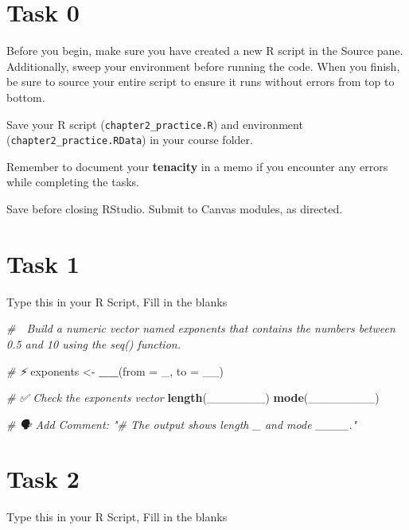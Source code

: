 \documentclass[
  12pt,
]{scrreprt}
\newenvironment{Shaded}{\begin{snugshade}}{\end{snugshade}}
\newcommand{\AttributeTok}[1]{\textcolor[rgb]{0.13,0.29,0.53}{#1}}
\newcommand{\CommentTok}[1]{\textcolor[rgb]{0.56,0.35,0.01}{\textit{#1}}}
\newcommand{\FunctionTok}[1]{\textcolor[rgb]{0.13,0.29,0.53}{\textbf{#1}}}
\newcommand{\NormalTok}[1]{#1}
\newcommand{\OtherTok}[1]{\textcolor[rgb]{0.56,0.35,0.01}{#1}}
\begin{document}
\section{Task 0}\label{task-0}

Before you begin, make sure you have created a new R script in the
Source pane. Additionally, sweep your environment before running the
code. When you finish, be sure to source your entire script to ensure it
runs without errors from top to bottom.

Save your R script (\texttt{chapter2\_practice.R}) and environment
(\texttt{chapter2\_practice.RData}) in your course folder.

Remember to document your \textbf{tenacity} in a memo if you encounter
any errors while completing the tasks.

Save before closing RStudio. Submit to Canvas modules, as directed.

\section{Task 1}\label{task-1}

Type this in your R Script, Fill in the blanks

\begin{Shaded}
\begin{Highlighting}[]
\CommentTok{\# 🎯 Build a numeric vector named \textasciigrave{}exponents\textasciigrave{} that contains the numbers between 0.5 and 10 using the \textasciigrave{}seq()\textasciigrave{} function.}


\CommentTok{\# ⚡ }
\NormalTok{exponents }\OtherTok{\textless{}{-}} \FunctionTok{\_\_}\NormalTok{(}\AttributeTok{from =}\NormalTok{ \_, }\AttributeTok{to =}\NormalTok{ \_\_)}

\CommentTok{\# ✅ Check the exponents vector}
\FunctionTok{length}\NormalTok{(\_\_\_\_\_\_\_)}
\FunctionTok{mode}\NormalTok{(\_\_\_\_\_\_\_\_)}

\CommentTok{\# 🗣 Add Comment: "\# The output shows length \_ and mode \_\_\_\_."}
\end{Highlighting}
\end{Shaded}

\section{Task 2}\label{task-2}

Type this in your R Script, Fill in the blanks
\end{document}
